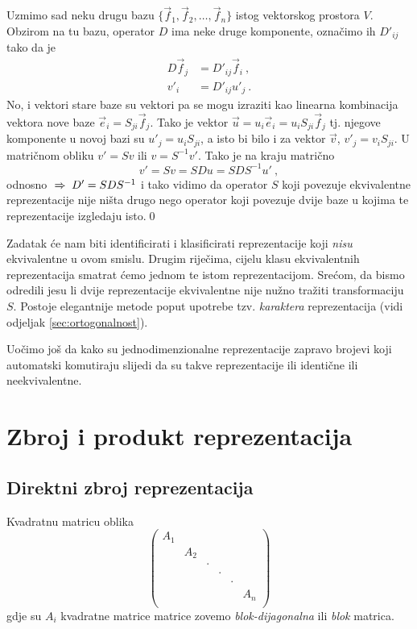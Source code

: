Uzmimo sad neku drugu bazu $\{\vec{f}_1, \vec{f}_2, \ldots, \vec{f}_n\}$
istog vektorskog prostora $V$.
Obzirom na tu bazu, operator $D$ ima neke druge komponente, označimo ih
$D'_{ij}$ tako da je
\begin{align}
    D \vec{f}_j& = D'_{ij} \vec{f}_i  \:, \\
    v'_i& = D'_{ij} u'_j \:.
\end{align}
No, i vektori stare baze su vektori pa se mogu izraziti kao linearna
kombinacija vektora nove baze $\vec{e}_i = S_{ji} \vec{f}_j$.
Tako je vektor $\vec{u}=u_i \vec{e}_i = u_i S_{ji} \vec{f}_j$ tj.
njegove komponente u novoj bazi su
$u'_j = u_i S_{ji}$, a isto bi bilo i za vektor $\vec{v}$,  $v'_j = v_i S_{ji}$.
U matričnom obliku $v'=Sv$ ili  $v=S^{-1}v'$.
Tako je na kraju matrično
\begin{equation}
v'=Sv=SDu=SDS^{-1}u' \:,
\end{equation}
odnosno $\;\Rightarrow\; D'=SDS^{-1}$ i tako vidimo da operator $S$ koji povezuje
ekvivalentne reprezentacije nije ništa drugo nego operator koji povezuje
dvije baze u kojima te reprezentacije izgledaju isto.\qed

Zadatak će nam biti identificirati i klasificirati reprezentacije koji
\emph{nisu} ekvivalentne u ovom smislu. Drugim riječima, cijelu klasu
ekvivalentnih reprezentacija smatrat ćemo jednom te istom reprezentacijom.
Srećom, da bismo odredili jesu li dvije reprezentacije ekvivalentne
nije nužno tražiti transformaciju $S$. Postoje elegantnije metode
poput upotrebe tzv. \emph{karaktera} reprezentacija
(vidi odjeljak \ref{sec:ortogonalnost}).

Uočimo još da kako su jednodimenzionalne reprezentacije zapravo brojevi koji
automatski komutiraju slijedi da su takve reprezentacije ili identične ili
neekvivalentne.


\section{Zbroj i produkt reprezentacija}

\subsection*{Direktni zbroj reprezentacija}

Kvadratnu matricu oblika
\begin{displaymath}
   \left(
   \begin{array}{cccccc}
        A_1 & & & & & \\
        & A_2 & & & &  \\
        & & \cdot & & & \\
        & & &  \cdot  & & \\
        & & & &  \cdot   & \\
        & & & &  & A_n  \\
\end{array}
   \right)
\end{displaymath}
gdje su $A_i$ kvadratne matrice matrice
zovemo \emph{blok-dijagonalna} ili \emph{blok} matrica.

